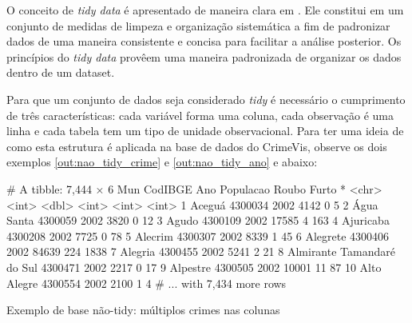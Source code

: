 \documentclass[12pt,openright,oneside,a4paper,english,french,spanish]{abntex2}
\numberwithin{table}{section} %
\numberwithin{figure}{section} %
\newcommand{\co}{\citeonline}
\begin{document}
O conceito de \textit{tidy data} é apresentado de maneira clara em \co{tidy_data}. Ele constitui em um conjunto de medidas de limpeza e organização sistemática a fim de padronizar dados de uma maneira consistente e concisa para facilitar a análise posterior. Os princípios do \textit{tidy data} provêem uma maneira padronizada de organizar os dados dentro de um dataset. 

Para que um conjunto de dados seja considerado \textit{tidy} é necessário o cumprimento de três características: cada variável forma uma coluna, cada observação é uma linha e cada tabela tem um tipo de unidade observacional. Para ter uma ideia de como esta estrutura é aplicada na base de dados do CrimeVis, observe os dois exemplos \ref{out:nao_tidy_crime} e \ref{out:nao_tidy_ano} e  abaixo:

\begin{routput}
\begin{Schunk}
\begin{Soutput}
# A tibble: 7,444 × 6
                          Mun CodIBGE   Ano Populacao Roubo Furto
*                       <chr>   <int> <dbl>     <int> <int> <int>
1                      Aceguá 4300034  2002      4142     0     5
2                  Água Santa 4300059  2002      3820     0    12
3                       Agudo 4300109  2002     17585     4   163
4                   Ajuricaba 4300208  2002      7725     0    78
5                     Alecrim 4300307  2002      8339     1    45
6                    Alegrete 4300406  2002     84639   224  1838
7                     Alegria 4300455  2002      5241     2    21
8  Almirante Tamandaré do Sul 4300471  2002      2217     0    17
9                    Alpestre 4300505  2002     10001    11    87
10                Alto Alegre 4300554  2002      2100     1     4
# ... with 7,434 more rows
\end{Soutput}
\end{Schunk}
\caption{Exemplo de base não-tidy: múltiplos crimes nas colunas}
\label{out:nao_tidy_crime}
\end{routput}
\end{document}
